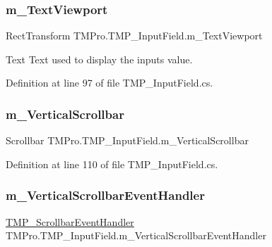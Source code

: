 \subsubsection{\texorpdfstring{m\_TextViewport}{m\_TextViewport}}
{\footnotesize\ttfamily Rect\+Transform T\+M\+Pro.\+T\+M\+P\+\_\+\+Input\+Field.\+m\+\_\+\+Text\+Viewport\hspace{0.3cm}{\ttfamily [protected]}}



Text Text used to display the input\textquotesingle{}s value. 



Definition at line 97 of file T\+M\+P\+\_\+\+Input\+Field.\+cs.

\mbox{\label{class_t_m_pro_1_1_t_m_p___input_field_a72bb99d7d3c24889ba474b9957b87c86}} 
\subsubsection{\texorpdfstring{m\_VerticalScrollbar}{m\_VerticalScrollbar}}
{\footnotesize\ttfamily Scrollbar T\+M\+Pro.\+T\+M\+P\+\_\+\+Input\+Field.\+m\+\_\+\+Vertical\+Scrollbar\hspace{0.3cm}{\ttfamily [protected]}}



Definition at line 110 of file T\+M\+P\+\_\+\+Input\+Field.\+cs.

\mbox{\label{class_t_m_pro_1_1_t_m_p___input_field_a44b82f1f901c2db14d9d584a834f6b1f}} 
\subsubsection{\texorpdfstring{m\_VerticalScrollbarEventHandler}{m\_VerticalScrollbarEventHandler}}
{\footnotesize\ttfamily \mbox{\hyperlink{class_t_m_pro_1_1_t_m_p___scrollbar_event_handler}{T\+M\+P\+\_\+\+Scrollbar\+Event\+Handler}} T\+M\+Pro.\+T\+M\+P\+\_\+\+Input\+Field.\+m\+\_\+\+Vertical\+Scrollbar\+Event\+Handler\hspace{0.3cm}{\ttfamily [protected]}}



